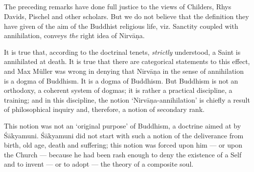 \documentclass[a4paper, 11pt, oneside, english]{article}
\begin{document}
\subsection{}
\paragraph{}
The preceding remarks have done full justice to the views of Childers, Rhys Davids, Pischel and other scholars. But we do not believe that the definition they have given of the aim of the Buddhist religious life, viz. Sanctity coupled with annihilation, conveys \emph{the} right idea of Nirvāṇa.

It is true that, according to the doctrinal tenets, \emph{strictly} understood, a Saint is annihilated at death. It is true that there are categorical statements to this effect, and Max Müller was wrong in denying that Nirvāṇa in the sense of annihilation is a dogma of Buddhism. It is a dogma of Buddhism. But Buddhism is not an orthodoxy, a coherent system of dogmas; it is rather a practical discipline, a training; and in this discipline, the notion `Nirvāṇa-annihilation' is chiefly a result of philosophical inquiry and, therefore, a notion of secondary rank.

This notion was not an `original purpose' of Buddhism, a doctrine aimed at by Śākyamuni. Śākyamuni did not start with such a notion of the deliverance from birth, old age, death and suffering; this notion was forced upon him --- or upon the Church --- because he had been rash enough to deny the existence of a Self and to invent --- or to adopt --- the theory of a composite soul.
\end{document}
